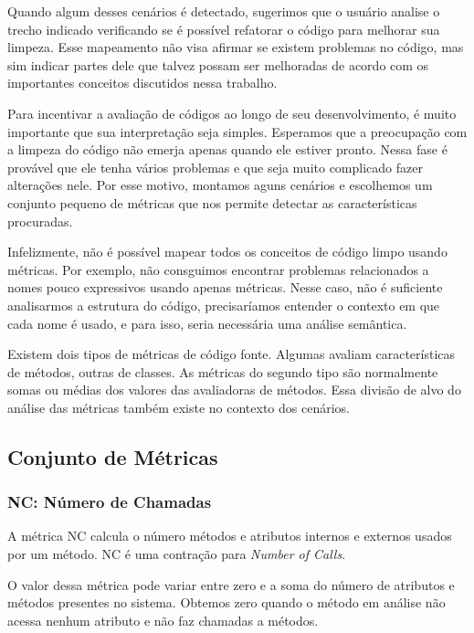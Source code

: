 	
	Quando algum desses cenários é detectado, sugerimos que o usuário analise o trecho indicado verificando se é possível refatorar o código para melhorar sua limpeza. Esse mapeamento não visa afirmar se existem problemas no código, mas sim indicar partes dele que talvez possam ser melhoradas de acordo com os importantes conceitos discutidos nessa trabalho.

	Para incentivar a avaliação de códigos ao longo de seu desenvolvimento, é muito importante que sua interpretação seja simples. Esperamos que a preocupação com a limpeza do código não emerja apenas quando ele estiver pronto. Nessa fase é provável que ele tenha vários problemas e que seja muito complicado fazer alterações nele. Por esse motivo, montamos aguns cenários e escolhemos um conjunto pequeno de métricas que nos permite detectar as características procuradas.
	
	Infelizmente, não é possível mapear todos os conceitos de código limpo usando métricas. Por exemplo, não consguimos encontrar problemas relacionados a nomes pouco expressivos usando apenas métricas. Nesse caso, não é suficiente analisarmos a estrutura do código, precisaríamos entender o contexto em que cada nome é usado, e para isso, seria necessária uma análise semântica.

	Existem dois tipos de métricas de código fonte. Algumas avaliam características de métodos, outras de classes. As métricas do segundo tipo são normalmente somas ou médias dos valores das avaliadoras de métodos. Essa divisão de alvo do análise das métricas também existe no contexto dos cenários.


\subsection{Conjunto de Métricas}

\subsubsection{NC: Número de Chamadas}
                             
	A métrica NC calcula o número métodos e atributos internos e externos usados por um método. NC é uma contração para \textit{Number of Calls}.

	O valor dessa métrica pode variar entre zero e a soma do número de atributos e métodos presentes no sistema. Obtemos zero quando o método em análise não acessa nenhum atributo e não faz chamadas a métodos.
	

